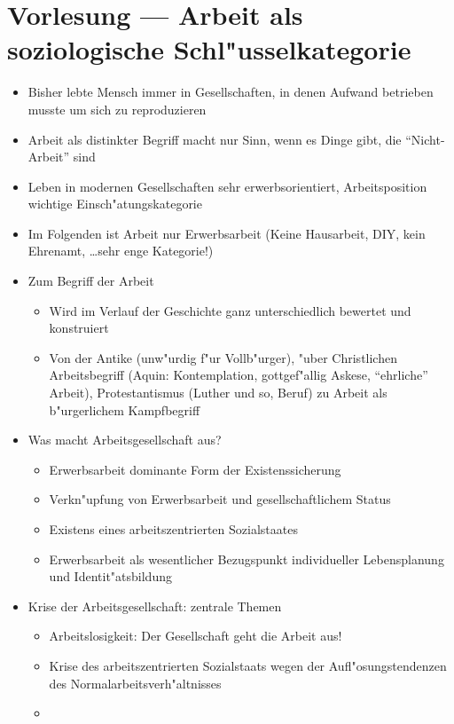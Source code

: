 \section{Vorlesung  --- Arbeit als soziologische Schl"usselkategorie}
\begin{itemize}
	\item
		Bisher lebte Mensch immer in Gesellschaften, in denen Aufwand betrieben musste um sich zu reproduzieren
	\item
		Arbeit als distinkter Begriff macht nur Sinn, wenn es Dinge gibt, die \enquote{Nicht-Arbeit} sind
	\item
		Leben in modernen Gesellschaften sehr erwerbsorientiert, Arbeitsposition wichtige Einsch"atungskategorie
	\item
		Im Folgenden ist Arbeit nur Erwerbsarbeit (Keine Hausarbeit, DIY, kein Ehrenamt, \dots sehr enge Kategorie!)
	\item
		Zum Begriff der Arbeit
		\begin{itemize}
			\item
				Wird im Verlauf der Geschichte ganz unterschiedlich bewertet und konstruiert
			\item
				Von der Antike (unw"urdig f"ur Vollb"urger), "uber Christlichen Arbeitsbegriff (Aquin: Kontemplation, gottgef"allig Askese, \enquote{ehrliche} Arbeit), Protestantismus (Luther und so, Beruf) zu Arbeit als b"urgerlichem Kampfbegriff
		\end{itemize}
	\item
		Was macht Arbeitsgesellschaft aus?
		\begin{itemize}
			\item
				Erwerbsarbeit dominante Form der Existenssicherung
			\item
				Verkn"upfung von Erwerbsarbeit und gesellschaftlichem Status
			\item
				Existens eines arbeitszentrierten Sozialstaates
			\item
				Erwerbsarbeit als wesentlicher Bezugspunkt individueller Lebensplanung und Identit"atsbildung
		\end{itemize}
	\item
		Krise der Arbeitsgesellschaft: zentrale Themen
		\begin{itemize}
			\item
				Arbeitslosigkeit: Der Gesellschaft geht die Arbeit aus!
			\item
				Krise des arbeitszentrierten Sozialstaats wegen der Aufl"osungstendenzen des Normalarbeitsverh"altnisses
			\item

\end{itemize}
\end{itemize}
